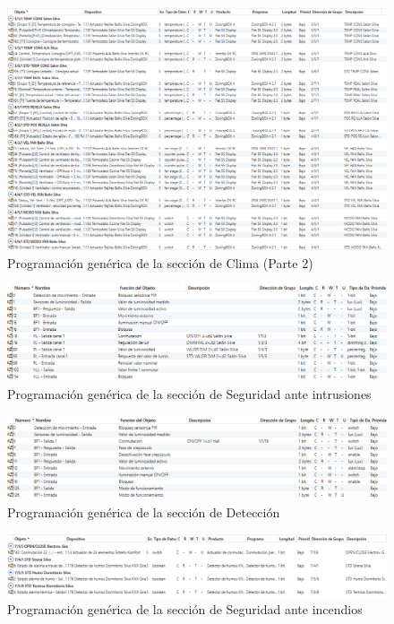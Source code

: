 \begin{landscape}
\begin{figure}[H]
\includegraphics[width=1.65\textwidth]{figures/prog_clima2.png}   \caption{Programación genérica de la sección de Clima (Parte 2)}
\label{fig:prog_clima2}
\end{figure}

\begin{figure}[H]
\includegraphics[width=1.55\textwidth]{figures/prog_pres.png}   
\caption{Programación genérica de la sección de Seguridad ante intrusiones}
\label{fig:prog_pres}
\end{figure}

\begin{figure}[H]
\includegraphics[width=1.55\textwidth]{figures/prog_mov.png}   
\caption{Programación genérica de la sección de Detección}
\label{fig:prog_mov}
\end{figure}

\begin{figure}[H]
\includegraphics[width=1.55\textwidth]{figures/prog_humo.png}   
\caption{Programación genérica de la sección de Seguridad ante incendios}
\label{fig:prog_humo}
\end{figure}
 \vspace{2cm}


\end{landscape}
